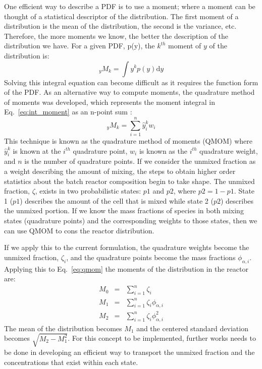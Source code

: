 One efficient way to describe a PDF is to use a moment; where a moment can be thought of a statistical descriptor of the distribution. The first moment of a distribution is the mean of the distribution, the second is the variance, etc. Therefore, the more moments we know, the better the description of the distribution we have. For a given PDF, p(y), the $k^{th}$ moment of $y$ of the distribution is:
\begin{equation}\label{eq:int_moment}
_{y}M_{k} = \int y^{k}p(y)\mathrm{d}y
\end{equation}
Solving this integral equation can become difficult as it requires the function form of the PDF. As an alternative way to compute moments, the quadrature method of moments was developed, which represents the moment integral in Eq.~\ref{eq:int_moment} as an n-point sum \cite{mcgraw:1997}:
\begin{equation}\label{eq:qmom}
_{y}M_{k}=\displaystyle \sum_{i=1}^{n} \hat y_{i}^{k} w_{i}
\end{equation}
This technique is known as the quadrature method of moments (QMOM) where  $\hat y_i^k$ is known at the $i^{th}$ quadrature point, $w_i$ is known as the $i^{th}$ quadrature weight, and $n$ is the number of quadrature points. If we consider the unmixed fraction as a weight describing the amount of mixing, the steps to obtain higher order statistics about the batch reactor composition begin to take shape. The unmixed fraction, $\zeta$, exists in two probabilistic states: $p1$ and $p2$, where $p2 = 1-p1$. State 1 ($p1$) describes the amount of the cell that is mixed while state 2 ($p2$) describes the unmixed portion. If we know the mass fractions of species in both mixing states (quadrature points) and the corresponding weights to those states, then we can use QMOM to cons the reactor distribution.

If we apply this to the current formulation, the quadrature weights become the unmixed fraction, $\zeta_{i}$, and the quadrature points become the mass fractions $\phi_{\alpha,i}$. Applying this to Eq.~\ref{eq:qmom} the moments of the distribution in the reactor are:
\begin{eqnarray}\label{eq:moments}
M_{0} &=& \displaystyle \sum_{i=1}^{n} \zeta_{i} \\
\nonumber M_{1} &=& \displaystyle \sum_{i=1}^{n} \zeta_{i} \phi_{\alpha,i} \\
\nonumber M_{2} &=& \displaystyle \sum_{i=1}^{n} \zeta_{i} \phi_{\alpha,i}^2
\end{eqnarray}
The mean of the distribution becomes $M_{1}$ and the centered standard deviation becomes $\sqrt{M_{2}-M_{1}^{2}}$. For this concept to be implemented, further works needs to be done in developing an efficient way to transport the unmixed fraction and the concentrations that exist within each state.

